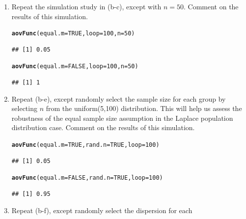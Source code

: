 \documentclass{article}\usepackage[]{graphicx}\usepackage[]{color}
\makeatletter
\newcommand{\hlnum}[1]{\textcolor[rgb]{0.686,0.059,0.569}{#1}}%
\newcommand{\hlstd}[1]{\textcolor[rgb]{0.345,0.345,0.345}{#1}}%
\newcommand{\hlkwc}[1]{\textcolor[rgb]{0.333,0.667,0.333}{#1}}%
\newcommand{\hlkwd}[1]{\textcolor[rgb]{0.737,0.353,0.396}{\textbf{#1}}}%
\newenvironment{kframe}{%
 \def\at@end@of@kframe{}%
 \ifinner\ifhmode%
  \def\at@end@of@kframe{\end{minipage}}%
  \begin{minipage}{\columnwidth}%
 \fi\fi%
 \def\FrameCommand##1{\hskip\@totalleftmargin \hskip-\fboxsep
 \colorbox{shadecolor}{##1}\hskip-\fboxsep
     \hskip-\linewidth \hskip-\@totalleftmargin \hskip\columnwidth}%
 \MakeFramed {\advance\hsize-\width
   \@totalleftmargin\z@ \linewidth\hsize
   \@setminipage}}%
 {\par\unskip\endMakeFramed%
 \at@end@of@kframe}
\newenvironment{knitrout}{}{} %
\makeatother
\begin{document}
\begin{enumerate}
\begin{enumerate}
  \item Repeat the simulation study in (b-c), except with $n=50$.
  Comment on the results of this simulation.
\begin{knitrout}
\color{fgcolor}\begin{kframe}
\begin{alltt}
\hlkwd{aovFunc}\hlstd{(}\hlkwc{equal.m}\hlstd{=}\hlnum{TRUE}\hlstd{,} \hlkwc{loop}\hlstd{=}\hlnum{100}\hlstd{,} \hlkwc{n}\hlstd{=}\hlnum{50}\hlstd{)}
\end{alltt}
\begin{verbatim}
## [1] 0.05
\end{verbatim}
\begin{alltt}
\hlkwd{aovFunc}\hlstd{(}\hlkwc{equal.m}\hlstd{=}\hlnum{FALSE}\hlstd{,} \hlkwc{loop}\hlstd{=}\hlnum{100}\hlstd{,} \hlkwc{n}\hlstd{=}\hlnum{50}\hlstd{)}
\end{alltt}
\begin{verbatim}
## [1] 1
\end{verbatim}
\end{kframe}
\end{knitrout}
\item Repeat (b-e), except randomly select the sample size for each 
group by selecting $n$ from the uniform(5,100) distribution. This 
will help us assess the robustness of the equal sample size assumption
in the Laplace population distribution case. Comment on the results of 
this simulation.
\begin{knitrout}
\color{fgcolor}\begin{kframe}
\begin{alltt}
\hlkwd{aovFunc}\hlstd{(}\hlkwc{equal.m}\hlstd{=}\hlnum{TRUE}\hlstd{,} \hlkwc{rand.n}\hlstd{=}\hlnum{TRUE}\hlstd{,} \hlkwc{loop}\hlstd{=}\hlnum{100}\hlstd{)}
\end{alltt}
\begin{verbatim}
## [1] 0.05
\end{verbatim}
\begin{alltt}
\hlkwd{aovFunc}\hlstd{(}\hlkwc{equal.m}\hlstd{=}\hlnum{FALSE}\hlstd{,} \hlkwc{rand.n}\hlstd{=}\hlnum{TRUE}\hlstd{,} \hlkwc{loop}\hlstd{=}\hlnum{100}\hlstd{)}
\end{alltt}
\begin{verbatim}
## [1] 0.95
\end{verbatim}
\end{kframe}
\end{knitrout}
\item Repeat (b-f), except randomly select the dispersion for each 

\end{enumerate}
\end{enumerate}
\end{document}
